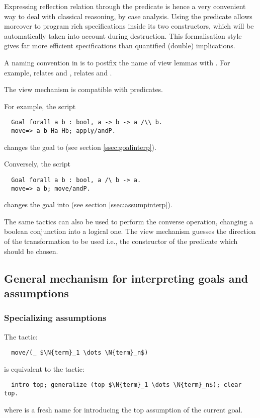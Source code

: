 Expressing reflection relation through the  predicate
is hence a very convenient way to deal with classical reasoning, by
case analysis. Using the  predicate allows moreover to
program rich specifications inside
its two constructors, which will be automatically taken into account
during destruction. This formalisation style gives far more
efficient specifications than quantified (double) implications.


A naming convention in \ssr{} is to postfix the name of view lemmas with .
For example,  relates  \C{||} and \C{\\/},  relates
\C{\~\~} and \C{\~}.

The view mechanism is compatible with  predicates.

For example, the script
\begin{lstlisting}
  Goal forall a b : bool, a -> b -> a /\\ b.
  move=> a b Ha Hb; apply/andP.
\end{lstlisting}
changes the goal  to  (see section \ref{ssec:goalinterp}).

Conversely, the script
\begin{lstlisting}
  Goal forall a b : bool, a /\ b -> a.
  move=> a b; move/andP.
\end{lstlisting}
changes the goal  into  (see section
\ref{ssec:assumpinterp}).


The same tactics can also be used to perform the converse
operation, changing a boolean conjunction into a logical one. The view
mechanism guesses the direction of the
transformation to be used i.e., the constructor of the 
predicate which should be chosen.

\subsection{General mechanism for interpreting goals and assumptions}


\subsubsection*{Specializing assumptions}

The \ssr{}
tactic:
\begin{lstlisting}
  move/(_ $\N{term}_1 \dots \N{term}_n$)
\end{lstlisting}
is equivalent to the tactic:
\begin{lstlisting}
  intro top; generalize (top $\N{term}_1 \dots \N{term}_n$); clear top.
\end{lstlisting}
where  is a fresh name for introducing the top assumption of
the current goal.

